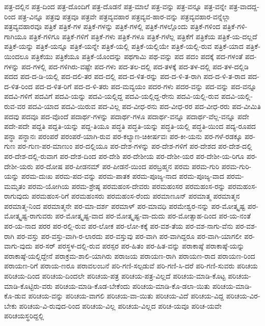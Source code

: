 {ಪತ್ರ-ದಲ್ಲಿನ
ಪತ್ರ-ದಿಂದ
ಪತ್ರ-ದೊಂದಿಗೆ
ಪತ್ರ-ದೊಡನೆ
ಪತ್ರ-ಮಾಲೆ
ಪತ್ರ-ವನ್ನು
ಪತ್ರ-ವನ್ನೂ
ಪತ್ರ-ವನ್ನೇ
ಪತ್ರ-ವಾದದ್ದ-ರಿಂದ
ಪತ್ರ-ವಿನ್ನೂ
ಪತ್ರವು
ಪತ್ರವೂ
ಪತ್ರವೇ
ಪತ್ರವ್ಯವಹಾರ
ಪತ್ರವ್ಯವ-ಹಾರ-ವನ್ನು
ಪತ್ರವ್ಯವಹಾರ-ವನ್ನೆಲ್ಲಾ
ಪತ್ರವ್ಯವಹಾರವೂ
ಪತ್ರಿಕೆ
ಪತ್ರಿಕೆ-ಗಳ
ಪತ್ರಿಕೆ-ಗಳನ್ನು
ಪತ್ರಿಕೆ-ಗಳಲ್ಲಿ
ಪತ್ರಿಕೆ-ಗಳಲ್ಲೊಂದು
ಪತ್ರಿಕೆ-ಗಳಿಂದ
ಪತ್ರಿಕೆ-ಗಳಿ-ಗಾಗಿಯೂ
ಪತ್ರಿಕೆ-ಗಳಿಗೂ
ಪತ್ರಿಕೆ-ಗಳಿಗೆ
ಪತ್ರಿಕೆ-ಗಳು
ಪತ್ರಿಕೆ-ಗಳೂ
ಪತ್ರಿಕೆ-ಗಳೆಲ್ಲ
ಪತ್ರಿಕೆಗೆ
ಪತ್ರಿಕೆಯ
ಪತ್ರಿಕೆ-ಯ-ದಲ್ಲದೆ
ಪತ್ರಿಕೆ-ಯನ್ನು
ಪತ್ರಿಕೆ-ಯನ್ನೂ
ಪತ್ರಿಕೆ-ಯನ್ನೇ
ಪತ್ರಿಕೆ-ಯಲ್ಲಿ
ಪತ್ರಿಕೆ-ಯಲ್ಲಿಯೇ
ಪತ್ರಿಕೆ-ಯಲ್ಲಿ-ರುವ
ಪತ್ರಿಕೆ-ಯಾದ
ಪತ್ರಿಕೆ-ಯಿಂದಲೂ
ಪತ್ರಿಕೆಯು
ಪತ್ರಿಕೆಯೂ
ಪತ್ರಿಕೆ-ಯೊಂದನ್ನು
ಪಥಗಾಮಿ
ಪಥ-ವನ್ನು
ಪದ
ಪದಂ
ಪದಕ್ಕೆ
ಪದ-ಗಳಂತೆ
ಪದ-ಗಳನ್ನು
ಪದ-ಗಳಲ್ಲಿ
ಪದ-ಗಳಿಗಿರು-ವಷ್ಟೇ
ಪದ-ಗಳು
ಪದ-ತಲ-ದಲ್ಲಿ
ಪದ-ತಳಕ್ಕೆ
ಪದ-ತಳ-ದಲ್ಲಿ
ಪದ-ತಳ-ದಲ್ಲಿಡಿ
ಪದದ
ಪದ-ದ-ಡಿ-ಯಲ್ಲಿ
ಪದ-ದಲಿ-ತರ
ಪದ-ದಲ್ಲಿ
ಪದ-ದ-ಳಿತ-ರನ್ನು
ಪದ-ದ-ಳಿ-ತ-ರಾಗಿ
ಪದ-ದ-ಳಿ-ತ-ರಾದ
ಪದ-ದ-ಳಿತ-ರಿಂದ
ಪದ-ದ-ಳಿತ-ರಿಗೆ
ಪದ-ದ-ಳಿ-ತರು
ಪದ-ಮವ್ಯಯಂ
ಪದರ-ಗಳು
ಪದರ-ವನ್ನು
ಪದ-ವನ್ನು
ಪದ-ವನ್ನೂ
ಪದವಿ-ಗಳಿಗೆ
ಪದವಿಗೆ
ಪದವಿ-ಯನ್ನು
ಪದವಿ-ಯಲ್ಲಿದ್ದ
ಪದವಿ-ಯಲ್ಲಿದ್ದ-ರೇನು
ಪದವಿ-ಯಲ್ಲಿ-ರುವ
ಪದವಿ-ಯಲ್ಲಿ-ರುವ-ವರ
ಪದವಿ-ಯಾದ
ಪದವಿ-ಯಿರುವ
ಪದ-ವಿಲ್ಲ
ಪದ-ವೀಧ-ರನು
ಪದ-ವೀಧ-ರರ
ಪದ-ವೀಧ-ರರು
ಪದ-ವೀಮಿತಿ
ಪದವು
ಪದವೂ
ಪದ-ವೊಂದೆ
ಪದಾರ್ಥ-ಗಳನ್ನು
ಪದಾರ್ಥ-ಗಳೂ
ಪದಾರ್ಥ-ವನ್ನೂ
ಪದಾರ್ಥ-ವೆಲ್ಲ-ವನ್ನೂ
ಪದೇ
ಪದೇ-ಪದೇ
ಪದ್ದತಿ
ಪದ್ದತಿ-ಯನ್ನು
ಪದ್ದ-ತಿಯೂ
ಪದ್ಧತಿ
ಪದ್ಧತಿ-ಯನ್ನು
ಪದ್ಧತಿ-ಯಲ್ಲಿ
ಪದ್ಧತಿ-ಯಿಂದ
ಪದ್ಯ-ರೂಪದ
ಪನ್ಥಾ
ಪನ್ಥಾನಃ
ಪರಂಪರೆ
ಪರಂಪರೆ-ಯಾಗಿ-ರುವ
ಪರ-ಕಲ್ಯಾಣ-ಚಿಕೀರ್ಷವಃ
ಪರ-ಕೀ-ಯನು
ಪರ-ಗಳೆ-ರಡಕ್ಕೂ
ಪರ-ಗುಣ
ಪರ-ಗುಣ-ಪರ-ಮಾಣುಂ
ಪರ-ದಲ್ಲಿಯೂ
ಪರ-ದೇಶ-ಗಳನ್ನು
ಪರ-ದೇಶ-ಗಳಿಗೆ
ಪರ-ದೇಶದ
ಪರ-ದೇಶ-ದಲ್ಲಿ
ಪರ-ದೇಶ-ದಲ್ಲಿ-ರುವಾಗ
ಪರ-ದೇಶ-ದಿಂದ
ಪರ-ದೇಶಿ
ಪರ-ದೇಶೀಯ
ಪರ-ದೇಶೀ-ಯರ
ಪರ-ದೇಶೀ-ಯ-ರಿಗೂ
ಪರ-ದೇಶೀ-ಯರು
ಪರ-ದೋಷ
ಪರ-ಪೀಡನಮ್
ಪರ-ಪೀಡನೆ-ಯಿಂದ
ಪರಬ್ರಹ್ಮನ
ಪರಮ
ಪರಮ-ಗುರಿ
ಪರಮ-ಗುರಿ-ಯನ್ನು
ಪರಮ-ದುಃಖ
ಪರಮ-ಪದ-ವನ್ನು
ಪರಮ-ಪಾತಕ
ಪರಮ-ಪೂಜ್ಯ-ನಾದ
ಪರಮ-ಪೂಜ್ಯ-ವಾದ
ಪರಮ-ಮಮೃತಂ
ಪರಮ-ಯೋಗಿಯ
ಪರಮ-ಶ್ರೇಷ್ಠ
ಪರಮಹಂಸ-ದೇವರು
ಪರಮಹಂಸರ
ಪರಮಹಂಸ-ರನ್ನು
ಪರಮಹಂಸ-ರಾಗುವುದು
ಪರಮಹಂಸ-ರಿಗೆ
ಪರಮಹಂಸರು
ಪರಮಹಂಸ-ರೆಂದು
ಪರಮಾಣೂನ್
ಪರಮಾತ್ಮ
ಪರಮಾತ್ಮನ
ಪರಮಾತ್ಮ-ನಿಂದ
ಪರಮಾತ್ಮನೇ
ಪರ-ಮಾ-ದರ್ಶ
ಪರಮಾಳ್
ಪರ-ಮಾವಧಿ
ಪರಮೇಶ್ವರ-ನನ್ನು
ಪರ-ಮೋತ್ಕೃಷ್ಟ
ಪರ-ಮೋತ್ಕೃಷ್ಟ-ರಾಗುವರು
ಪರ-ಮೋತ್ಕೃಷ್ಟ-ವಾದ
ಪರ-ಮೋತ್ಕೃಷ್ಟ-ವಾ-ದುದು
ಪರ-ಮೋತ್ಸಾಹ-ದಿಂದ
ಪರ-ಯ-ನಂತೆ
ಪರ-ಯ-ನಾದ
ಪರರ
ಪರ-ರಲ್ಲಿ-ರುವ
ಪರ-ಲೋಕ
ಪರ-ಲೋ-ಕಕ್ಕೆ
ಪರ-ವಶ-ತೆಯ
ಪರ-ವಶ-ನಾಗು-ವೆನು
ಪರ-ವಶ-ರಾಗಿ
ಪರ-ವಸ್ತು
ಪರ-ವಸ್ತು-ವಾಗಿ-ರ-ಲಾರದು
ಪರ-ವಸ್ತುವು
ಪರ-ವಾಗಿ
ಪರ-ವಾಗಿದ್ದರೂ
ಪರ-ವಾಗಿ-ಯಾಗಲೀ
ಪರ-ವಾಗು-ವುದು
ಪರ-ಸರ್
ಪರಸ್ಥಳ-ದಲ್ಲಿ-ರುವ
ಪರಸ್ಪರ
ಪರ-ಹಿತಂ
ಪರ-ಹಿತ-ವನ್ನು
ಪರಾಕಾಷ್ಠೆ
ಪರಾಕಾಷ್ಠೆ-ಯನ್ನು
ಪರಾಕಾಷ್ಠೆ-ಯಲ್ಲಿದ್ದೇನೆ
ಪರಾಕ್ರಮ-ಶಾಲಿ-ಯಾಗಿರು
ಪರಾಜಯ
ಪರಾಯಣ-ರಾಗಿ
ಪರಾಯಣ-ರಾದ
ಪರಾಯಣ-ರಿಂದ
ಪರಾಯಣ-ರಿಗೆ
ಪರಾಯ-ಣರೂ
ಪರಾವಲಂಬನೆ
ಪರಿ-ಗಣಿ-ಸಲ್ಪಡುವೆ
ಪರಿ-ಗಣಿ-ಸಿ-ದರೆ
ಪರಿ-ಗಣಿ-ಸುವರು
ಪರಿಚಯ
ಪರಿಚಯ-ದಿಂದ
ಪರಿಚಯ-ದಿಂದಲೇ
ಪರಿಚಯ-ಪತ್ರ
ಪರಿಚಯ-ಪತ್ರ-ವಿಲ್ಲದೆ
ಪರಿಚಯ-ಮಾಡಿ-ಕೊಟ್ಟ
ಪರಿಚಯ-ಮಾಡಿ-ಕೊಟ್ಟಿರು-ವರು
ಪರಿಚಯ-ಮಾಡಿ-ಕೊಡ-ಬೇಕೆಂದು
ಪರಿಚಯ-ಮಾಡಿ-ಕೊ-ಡಲಾ-ಯಿತು
ಪರಿಚಯ-ಮಾಡಿ-ಕೊ-ಡುವ
ಪರಿಚಯ-ವನ್ನು
ಪರಿಚಯ-ವಾಗಲಿ
ಪರಿಚಯ-ವಾ-ಯಿತು
ಪರಿಚಯ-ವಿದೆ
ಪರಿಚಯ-ವಿದ್ದ
ಪರಿಚಯ-ವಿರ-ಬೇಕು
ಪರಿಚಯ-ವಿ-ರುವುದ-ರಿಂದ
ಪರಿಚಯ-ವಿಲ್ಲ
ಪರಿಚಯ-ವಿಲ್ಲದ
ಪರಿಚ-ಯವೂ
ಪರಿಚ-ಯವೇ
ಪರಿಚಯಸ್ಥರಿದ್ದಲ್ಲಿ
}
